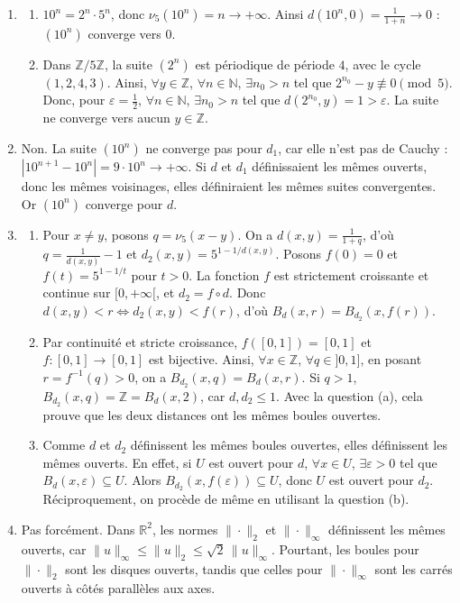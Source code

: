 \documentclass[11pt,a4paper]{article}
\begin{document}
\begin{enumerate}[label=\arabic*.,leftmargin=*,itemsep=1em,start=5]
\item
  \begin{enumerate}[label=(\alph*),itemsep=.6em]
  \item $10^n=2^n\cdot5^n$, donc $\nu_5(10^n)=n\to+\infty$. Ainsi $d(10^n,0)=\frac{1}{1+n}\to0$ : $(10^n)$ converge vers $0$.

  \item Dans $\mathbb Z/5\mathbb Z$, la suite $(2^n)$ est périodique de période $4$, avec le cycle $(1,2,4,3)$. Ainsi, $\forall y\in\mathbb Z$, $\forall n\in\mathbb N$, $\exists n_0>n$ tel que $2^{n_0}-y\not\equiv0\pmod5$. Donc, pour $\varepsilon=\frac12$, $\forall n\in\mathbb N$, $\exists n_0>n$ tel que $d(2^{n_0},y)=1>\varepsilon$. La suite ne converge vers aucun $y\in\mathbb Z$.
  \end{enumerate}

\item Non. La suite $(10^n)$ ne converge pas pour $d_1$, car elle n'est pas de Cauchy : $|10^{n+1}-10^n|=9\cdot10^n\to+\infty$. Si $d$ et $d_1$ définissaient les mêmes ouverts, donc les mêmes voisinages, elles définiraient les mêmes suites convergentes. Or $(10^n)$ converge pour $d$.

\item
  \begin{enumerate}[label=(\alph*),itemsep=.6em]
  \item Pour $x\neq y$, posons $q=\nu_5(x-y)$. On a $d(x,y)=\frac{1}{1+q}$, d'où $q=\frac{1}{d(x,y)}-1$ et $d_2(x,y)=5^{1-1/d(x,y)}$. Posons $f(0)=0$ et $f(t)=5^{1-1/t}$ pour $t>0$. La fonction $f$ est strictement croissante et continue sur $[0,+\infty[$, et $d_2=f\circ d$. Donc $d(x,y)<r\iff d_2(x,y)<f(r)$, d'où $B_d(x,r)=B_{d_2}(x,f(r))$.

  \item Par continuité et stricte croissance, $f([0,1])=[0,1]$ et $f:[0,1]\to[0,1]$ est bijective. Ainsi, $\forall x\in\mathbb Z$, $\forall q\in]0,1]$, en posant $r=f^{-1}(q)>0$, on a $B_{d_2}(x,q)=B_d(x,r)$. Si $q>1$, $B_{d_2}(x,q)=\mathbb Z=B_d(x,2)$, car $d,d_2\leq1$. Avec la question (a), cela prouve que les deux distances ont les mêmes boules ouvertes.

  \item Comme $d$ et $d_2$ définissent les mêmes boules ouvertes, elles définissent les mêmes ouverts. En effet, si $U$ est ouvert pour $d$, $\forall x\in U$, $\exists\varepsilon>0$ tel que $B_d(x,\varepsilon)\subseteq U$. Alors $B_{d_2}(x,f(\varepsilon))\subseteq U$, donc $U$ est ouvert pour $d_2$. Réciproquement, on procède de même en utilisant la question (b).
  \end{enumerate}

\item Pas forcément. Dans $\mathbb R^2$, les normes $\|\cdot\|_2$ et $\|\cdot\|_\infty$ définissent les mêmes ouverts, car $\|u\|_\infty\leq\|u\|_2\leq\sqrt2\,\|u\|_\infty$. Pourtant, les boules pour $\|\cdot\|_2$ sont les disques ouverts, tandis que celles pour $\|\cdot\|_\infty$ sont les carrés ouverts à côtés parallèles aux axes.
\end{enumerate}
\end{document}
